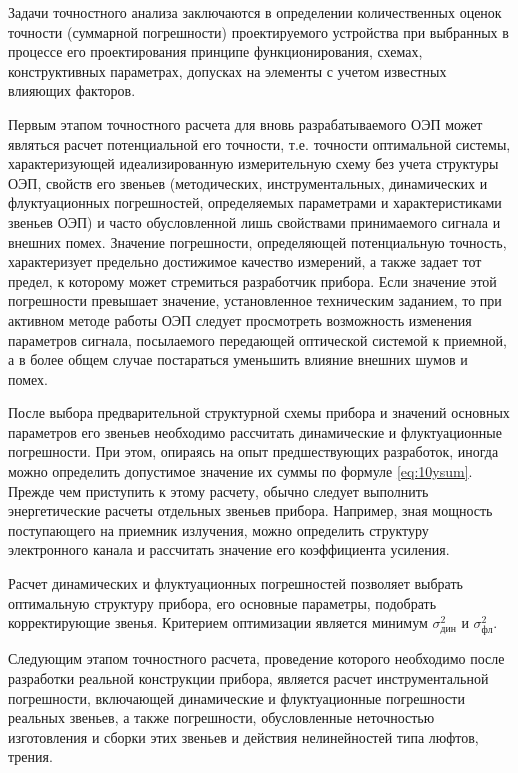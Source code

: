 Задачи точностного анализа заключаются в определении количественных оценок точности (суммарной погрешности) проектируемого устройства при выбранных в процессе его проектирования принципе функционирования, схемах, конструктивных параметрах, допусках на элементы с учетом известных влияющих факторов.

Первым этапом точностного расчета для вновь разрабатываемого ОЭП может являться расчет потенциальной его точности, т.е. точности оптимальной системы, характеризующей идеализированную измерительную схему без учета структуры ОЭП, свойств его звеньев (методических, инструментальных, динамических и флуктуационных погрешностей, определяемых параметрами и характеристиками звеньев ОЭП) и часто обусловленной лишь свойствами принимаемого сигнала и внешних помех. Значение погрешности, определяющей потенциальную точность, характеризует предельно достижимое качество измерений, а также задает тот предел, к которому может стремиться разработчик прибора. Если значение этой погрешности превышает значение, установленное техническим заданием, то при активном методе работы ОЭП следует просмотреть возможность изменения параметров сигнала, посылаемого передающей оптической системой к приемной, а в более общем случае постараться уменьшить влияние внешних шумов и помех.
 
После выбора предварительной структурной схемы прибора и значений основных параметров его звеньев необходимо рассчитать динамические и флуктуационные погрешности. При этом, опираясь на опыт предшествующих разработок, иногда можно определить допустимое значение их суммы по формуле \eqref{eq:10ysum}. Прежде чем приступить к этому расчету, обычно следует выполнить энергетические расчеты отдельных звеньев прибора. Например, зная мощность поступающего на приемник излучения, можно определить структуру электронного канала и рассчитать значение его коэффициента усиления.

Расчет динамических и флуктуационных погрешностей позволяет выбрать оптимальную структуру прибора, его основные параметры, подобрать корректирующие звенья. Критерием оптимизации является минимум $ \sigma^2_\text{дин} $ и $ \sigma^2_\text{фл} $.

Следующим этапом точностного расчета, проведение которого необходимо после разработки реальной конструкции прибора, является расчет инструментальной погрешности, включающей динамические и флуктуационные погрешности реальных звеньев, а также погрешности, обусловленные неточностью изготовления и сборки этих звеньев и действия нелинейностей типа люфтов, трения.

